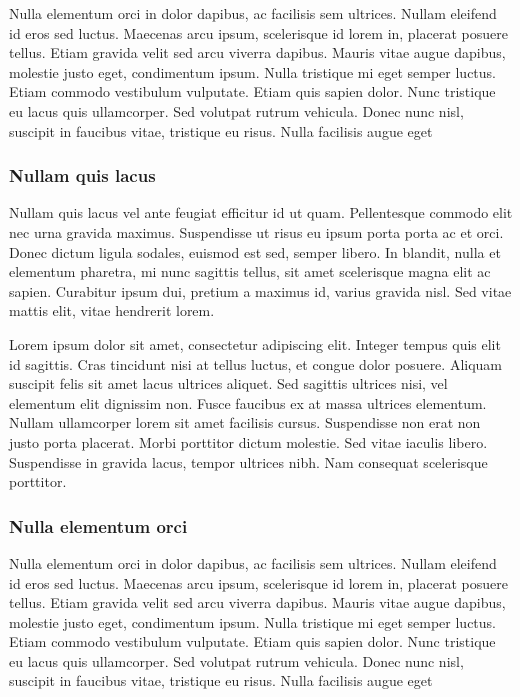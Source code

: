 Nulla elementum orci in dolor dapibus, ac facilisis sem ultrices. Nullam eleifend id eros sed luctus. Maecenas arcu ipsum, scelerisque id lorem in, placerat posuere tellus. Etiam gravida velit sed arcu viverra dapibus. Mauris vitae augue dapibus, molestie justo eget, condimentum ipsum. Nulla tristique mi eget semper luctus. Etiam commodo vestibulum vulputate. Etiam quis sapien dolor. Nunc tristique eu lacus quis ullamcorper. Sed volutpat rutrum vehicula. Donec nunc nisl, suscipit in faucibus vitae, tristique eu risus. Nulla facilisis augue eget


\subsubsection{Nullam quis lacus}

Nullam quis lacus vel ante feugiat efficitur id ut quam. Pellentesque commodo elit nec urna gravida maximus. Suspendisse ut risus eu ipsum porta porta ac et orci. Donec dictum ligula sodales, euismod est sed, semper libero. In blandit, nulla et elementum pharetra, mi nunc sagittis tellus, sit amet scelerisque magna elit ac sapien. Curabitur ipsum dui, pretium a maximus id, varius gravida nisl. Sed vitae mattis elit, vitae hendrerit lorem.

Lorem ipsum dolor sit amet, consectetur adipiscing elit. Integer tempus quis elit id sagittis. Cras tincidunt nisi at tellus luctus, et congue dolor posuere. Aliquam suscipit felis sit amet lacus ultrices aliquet. Sed sagittis ultrices nisi, vel elementum elit dignissim non. Fusce faucibus ex at massa ultrices elementum. Nullam ullamcorper lorem sit amet facilisis cursus. Suspendisse non erat non justo porta placerat. Morbi porttitor dictum molestie. Sed vitae iaculis libero. Suspendisse in gravida lacus, tempor ultrices nibh. Nam consequat scelerisque porttitor.

\subsubsection{Nulla elementum orci}

Nulla elementum orci in dolor dapibus, ac facilisis sem ultrices. Nullam eleifend id eros sed luctus. Maecenas arcu ipsum, scelerisque id lorem in, placerat posuere tellus. Etiam gravida velit sed arcu viverra dapibus. Mauris vitae augue dapibus, molestie justo eget, condimentum ipsum. Nulla tristique mi eget semper luctus. Etiam commodo vestibulum vulputate. Etiam quis sapien dolor. Nunc tristique eu lacus quis ullamcorper. Sed volutpat rutrum vehicula. Donec nunc nisl, suscipit in faucibus vitae, tristique eu risus. Nulla facilisis augue eget